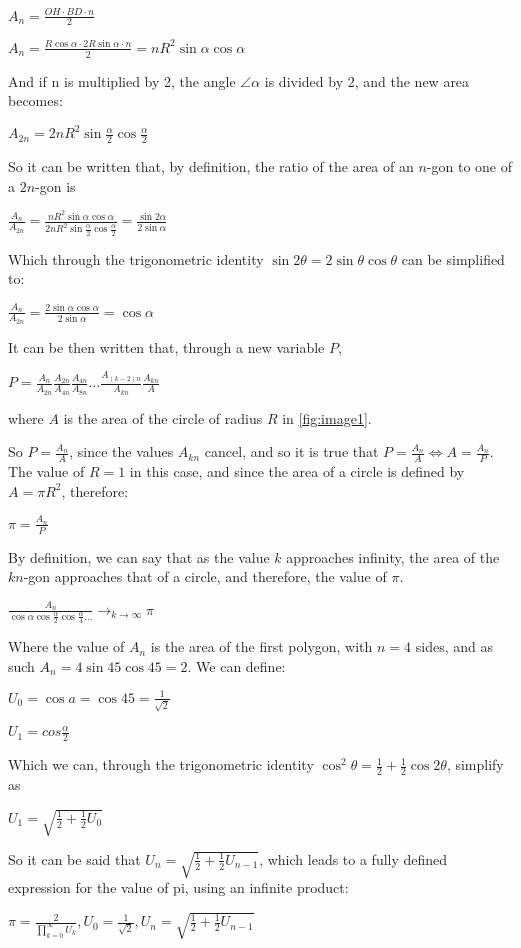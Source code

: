 $A_{n} = \frac{OH \cdot BD \cdot n}{2}$ 

$A_{n} = \frac{R \cos{\alpha} \cdot 2 R \sin{\alpha} \cdot n}{2} = n R^2 \sin{\alpha} \cos{\alpha}$

And if n is multiplied by 2, the angle $\angle \alpha$ is divided by 2, and the new area becomes:

$A_{2n} = 2n R^2 \sin{\frac{\alpha}{2}} \cos{\frac{\alpha}{2}}$

So it can be written that, by definition, the ratio of the area of an $n$-gon to one of a $2n$-gon is

$\frac{A_{n}}{A_{2n}} = \frac{n R^2 \sin{\alpha} \cos{\alpha}}{2 n R^2 \sin{\frac{\alpha}{2}} \cos{\frac{\alpha}{2}}} = \frac{\sin{2 \alpha}}{2 \sin{\alpha}}$

Which through the trigonometric identity $\sin{2 \theta} = 2\sin{\theta} \cos{\theta}$ can be simplified to:

$\frac{A_{n}}{A_{2n}} = \frac{2\sin{\alpha} \cos{\alpha} }{2\sin{\alpha}}  = \cos{\alpha}$

It can be then written that, through a new variable $P$, 

$P = \frac{A_{n}}{A_{2n}} \frac{A_{2n}}{A_{4n}} \frac{A_{4n}}{A_{8n}} \dots \frac{A_{(k-2)n}}{A_{kn}} \frac{A_{kn}}{A}$ 

where $A$ is the area of the circle of radius $R$ in \ref{fig:image1}.

So $P = \frac{A_{n}}{A}$, since the values $A_{kn}$ cancel, and so it is true that $P = \frac{A_{n}}{A} \Leftrightarrow A = \frac{A_{n}}{P}$. The value of $R = 1$ in this case, and since the area of a circle is defined by $A = \pi R^2$, therefore: 

$\pi = \frac{A_{n}}{P}$ 

By definition, we can say that as the value $k$ approaches infinity, the area of the $kn$-gon approaches that of a circle, and therefore, the value of $\pi$.

$\frac{A_{n}}{\cos{\alpha} \cos{\frac{\alpha}{2}} \cos{\frac{\alpha}{4}} \dots}\to_{k \to \infty} \pi$

Where the value of $A_{n}$ is the area of the first polygon, with $n=4$ sides, and as such $A_{n} = 4 \sin{45} \cos{45} = 2$. We can define:

$U_{0} = \cos{a} = \cos{45} = \frac{1}{\sqrt{2}}$ 

$U_{1} = cos{\frac{\alpha}{2}}$ 

Which we can, through the trigonometric identity $\cos^2{\theta} = \frac{1}{2} + \frac{1}{2} \cos{2\theta}$, simplify as

$U_{1} = \sqrt{\frac{1}{2} + \frac{1}{2} U_{0}}$ 

So it can be said that $U_{n} = \sqrt{\frac{1}{2} + \frac{1}{2} U_{n - 1}}$, which leads to a fully defined expression for the value of pi, using an infinite product:

$\pi = \frac{2}{\prod\limits_{k=0}^\infty U_{k}}, U_{0} = \frac{1}{\sqrt{2}}, U_{n} = \sqrt{\frac{1}{2} + \frac{1}{2} U_{n - 1}}$ \footnotemark



